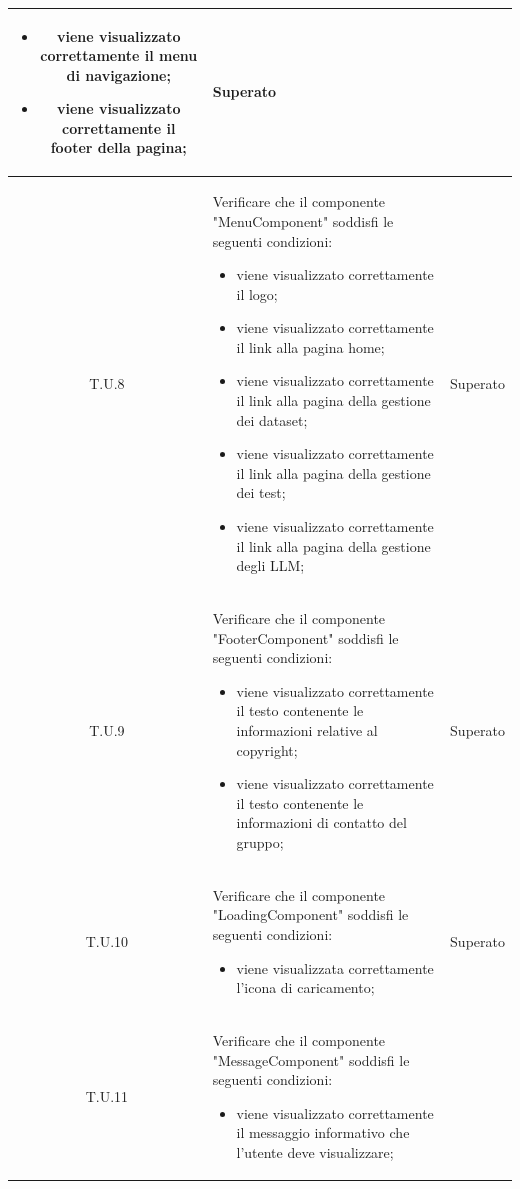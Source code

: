 \begin{tabularx}{\textwidth}{|c|X|c|}
    \begin{itemize}
        \item viene visualizzato correttamente il menu di navigazione;
        \item viene visualizzato correttamente il footer della pagina;
    \end{itemize}
    & Superato \\
    \hline
    \label{tu:tu33}T.U.8 & Verificare che il componente "MenuComponent" soddisfi le seguenti condizioni:
    \begin{itemize}
        \item viene visualizzato correttamente il logo;
        \item viene visualizzato correttamente il link alla pagina home;
        \item viene visualizzato correttamente il link alla pagina della gestione dei dataset;
        \item viene visualizzato correttamente il link alla pagina della gestione dei test;
        \item viene visualizzato correttamente il link alla pagina della gestione degli LLM;
    \end{itemize}
    & Superato \\
    \hline
    \label{tu:tu34}T.U.9 & Verificare che il componente "FooterComponent" soddisfi le seguenti condizioni: 
    \begin{itemize}
        \item viene visualizzato correttamente il testo contenente le informazioni relative al copyright;
        \item viene visualizzato correttamente il testo contenente le informazioni di contatto del gruppo; 
    \end{itemize}
    & Superato \\
    \hline
    \label{tu:tu35}T.U.10 & Verificare che il componente "LoadingComponent" soddisfi le seguenti condizioni: 
    \begin{itemize}
        \item viene visualizzata correttamente l'icona di caricamento;
    \end{itemize}
    & Superato \\
    \hline
    \label{tu:tu36}T.U.11 & Verificare che il componente "MessageComponent" soddisfi le seguenti condizioni: 
    \begin{itemize}
        \item viene visualizzato correttamente il messaggio informativo che l'utente deve visualizzare;

\end{itemize}
\end{tabularx}
